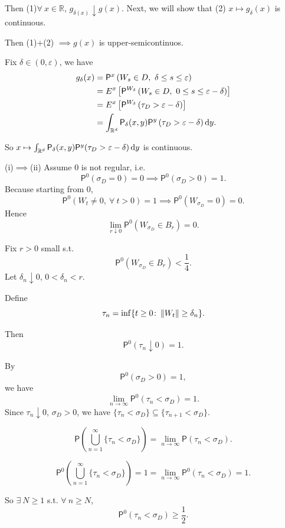 {    Then (1)$\forall~ x \in \mathbb{R}$, $g_{\delta(x)}\downarrow g(x)$. Next, we will show that (2) $x\mapsto g_\delta(x)$ is continuous.

    Then (1)+(2) $\implies g(x)$ is upper-semicontinuos. 

    Fix $\delta \in (0,\varepsilon)$, we have 
    $$
    \begin{aligned}
    g_\delta(x) &= \mathsf{P}^x\left( W_s\in D,~ \delta \leq s \leq \varepsilon \right) \\
    &= E^x\left[ \mathsf{P}^{W_{\delta}}\left( W_s \in D,~ 0 \leq s \leq \varepsilon - \delta  \right) \right] \\
    &= E^x\left[ \mathsf{P}^{W_\delta}\left( \tau_D > \varepsilon - \delta \right) \right]\\
    &= \int_{\mathbb{R}^d} \mathsf{P}_{\delta}(x,y)\mathsf{P}^y \left( \tau_D > \varepsilon - \delta \right) \mathop{}\!\mathrm{d} y.
    \end{aligned}
    $$

    So $x\mapsto \int_{\mathbb{R}^d} \mathsf{P}_{\delta}(x,y)\mathsf{P}^y(\tau_D > \varepsilon - \delta) \mathop{}\!\mathrm{d} y$ is continuous.

    (i)$\implies$(ii) Assume 0 is not regular, i.e.
    $$
    \mathsf{P}^0(\sigma_D = 0 ) = 0 \implies \mathsf{P}^0 (\sigma_D > 0) = 1.
    $$
    Because starting from 0,
    $$
    \mathsf{P}^0\left( W_t \neq 0,~\forall~t > 0 \right) = 1 \implies \mathsf{P}^0 \left( W_{\sigma_D} = 0 \right) = 0.
    $$
    Hence 
    $$
    \lim_{r \downarrow 0}\mathsf{P}^0\left( W_{\sigma_D} \in B_r \right) = 0.
    $$

    Fix $r > 0$ small s.t.
    $$
    \mathsf{P}^0\left( W_{\sigma_D} \in B_r \right) < \frac{1}{4}.
    $$
    Let $\delta_n \downarrow 0$, $0 < \delta_n < r$. 

    Define
    $$
    \tau_n = \inf \{t \geq 0 \colon \left\|  W_t  \right\| \geq \delta_n\}.
    $$

    Then 
    $$
    \mathsf{P}^0\left( \tau_n \downarrow 0 \right) = 1.
    $$

    By 
    $$
    \mathsf{P}^0(\sigma_D > 0) = 1,
    $$
    we have 
    $$
    \lim_{n\to \infty}\mathsf{P}^0(\tau_n < \sigma_D) = 1.
    $$
    Since $\tau_n \downarrow 0$, $\sigma_D > 0$, we have $\{\tau_n < \sigma_D\} \subseteq \{\tau_{n+1} < \sigma_D\}$.

    $$
    \mathsf{P}\left( \bigcup_{n=1}^\infty \{\tau_n < \sigma_D\} \right) = \lim_{n\to \infty}\mathsf{P}(\tau_n < \sigma_D).
    $$

    $$
    \mathsf{P}^0\left( \bigcup_{n=1}^\infty \{\tau_n < \sigma _D\} \right) =1 = \lim_{n\to \infty}\mathsf{P}^0(\tau_n < \sigma_D) = 1.
    $$

    So $\exists~ N \geq 1$ s.t. $\forall~ n \geq N$,
    $$
    \mathsf{P}^0(\tau_n < \sigma_D) \geq \frac{1}{2}.
    $$
}